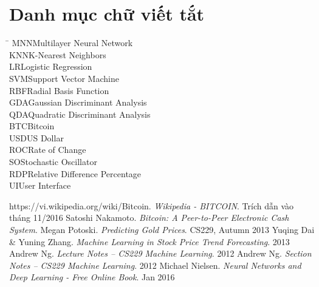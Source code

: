 \documentclass[12pt,a4paper]{report}
\begin{document}
 



\tableofcontents
\pagebreak
\listoffigures
\pagebreak 
\listoftables  
\pagebreak

\chapter*{Danh mục chữ viết tắt}
\thispagestyle{plain} 
\begin{tabbing}
\hspace{3cm}\= \kill
MNN\>Multilayer Neural Network\\
KNN\>K-Nearest Neighbors\\
LR\>Logistic Regression\\
SVM\>Support Vector Machine\\
RBF\>Radial Basis Function\\
GDA\>Gaussian Discriminant Analysis\\
QDA\>Quadratic Discriminant Analysis\\
BTC\>Bitcoin\\
USD\>US Dollar\\
ROC\>Rate of Change\\
SO\>Stochastic Oscillator\\
RDP\>Relative Difference Percentage\\
UI\>User Interface\\

\end{tabbing}

\pagebreak 


 



 
\pagebreak
\begin{thebibliography}{9}

https://vi.wikipedia.org/wiki/Bitcoin. \emph{Wikipedia - BITCOIN}. Trích dẫn vào
tháng 11/2016
Satoshi Nakamoto. \emph{Bitcoin: A Peer-to-Peer Electronic Cash System}.
Megan Potoski. \emph{Predicting Gold Prices}. CS229, Autumn 2013
Yuqing Dai \& Yuning Zhang. \emph{Machine Learning in Stock Price Trend Forecasting}. 2013 
Andrew Ng. \emph{Lecture Notes – CS229 Machine Learning}. 2012
Andrew Ng. \emph{Section Notes – CS229 Machine Learning}. 2012
Michael Nielsen. \emph{Neural Networks and Deep Learning - Free Online Book}. Jan 2016
\end{thebibliography}
\end{document}

